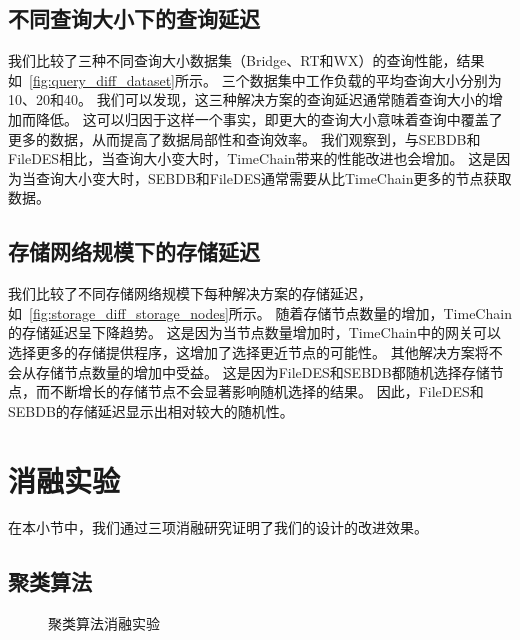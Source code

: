 \subsection{不同查询大小下的查询延迟}
我们比较了三种不同查询大小数据集（Bridge、RT和WX）的查询性能，结果如~\autoref{fig:query_diff_dataset}所示。
三个数据集中工作负载的平均查询大小分别为10、20和40。
我们可以发现，这三种解决方案的查询延迟通常随着查询大小的增加而降低。
这可以归因于这样一个事实，即更大的查询大小意味着查询中覆盖了更多的数据，从而提高了数据局部性和查询效率。
我们观察到，与SEBDB和FileDES相比，当查询大小变大时，TimeChain带来的性能改进也会增加。
这是因为当查询大小变大时，SEBDB和FileDES通常需要从比TimeChain更多的节点获取数据。

\subsection{存储网络规模下的存储延迟}
我们比较了不同存储网络规模下每种解决方案的存储延迟，如~\autoref{fig:storage_diff_storage_nodes}所示。
随着存储节点数量的增加，TimeChain的存储延迟呈下降趋势。
这是因为当节点数量增加时，TimeChain中的网关可以选择更多的存储提供程序，这增加了选择更近节点的可能性。
其他解决方案将不会从存储节点数量的增加中受益。
这是因为FileDES和SEBDB都随机选择存储节点，而不断增长的存储节点不会显著影响随机选择的结果。
因此，FileDES和SEBDB的存储延迟显示出相对较大的随机性。

\section{消融实验}
在本小节中，我们通过三项消融研究证明了我们的设计的改进效果。

\subsection{聚类算法}
\begin{figure*}[t]
    \centering
	\begin{minipage}{0.96\linewidth}
        \caption{聚类算法消融实验} 
    \end{minipage}
\end{figure*}


